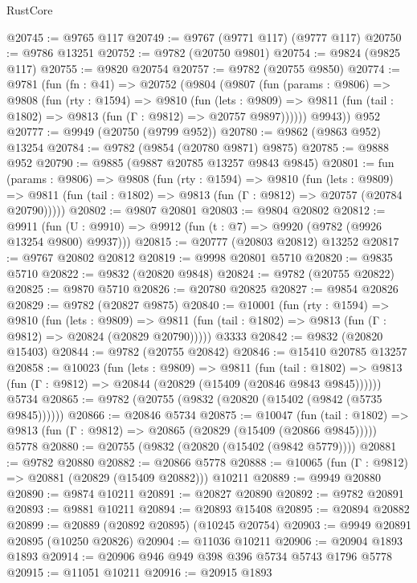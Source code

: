 \begin{lexlean}{RustCore}
\begin{coremodule}
@20745 := @9765 @117
@20749 := @9767 (@9771 @117) (@9777 @117)
@20750 := @9786 @13251
@20752 := @9782 (@20750 @9801)
@20754 := @9824 (@9825 @117)
@20755 := @9820 @20754
@20757 := @9782 (@20755 @9850)
@20774 := @9781
    (fun (fn : @41) =>
    @20752
      (@9804
        (@9807
          (fun (params : @9806) =>
          @9808
            (fun (rty : @1594) =>
            @9810
              (fun (lets : @9809) =>
              @9811 (fun (tail : @1802) => @9813 (fun (Γ : @9812) => @20757 @9897))))))
        @9943))
    @952
@20777 := @9949 (@20750 (@9799 @952))
@20780 := @9862 (@9863 @952) @13254
@20784 := @9782 (@9854 (@20780 @9871) @9875)
@20785 := @9888 @952
@20790 := @9885 (@9887 @20785 @13257 @9843 @9845)
@20801 := fun (params : @9806) =>
  @9808
    (fun (rty : @1594) =>
    @9810
      (fun (lets : @9809) =>
      @9811 (fun (tail : @1802) => @9813 (fun (Γ : @9812) => @20757 (@20784 @20790)))))
@20802 := @9807 @20801
@20803 := @9804 @20802
@20812 := @9911
    (fun (U : @9910) => @9912 (fun (t : @7) => @9920 (@9782 (@9926 @13254 @9800) @9937)))
@20815 := @20777 (@20803 @20812) @13252
@20817 := @9767 @20802 @20812
@20819 := @9998 @20801 @5710
@20820 := @9835 @5710
@20822 := @9832 (@20820 @9848)
@20824 := @9782 (@20755 @20822)
@20825 := @9870 @5710
@20826 := @20780 @20825
@20827 := @9854 @20826
@20829 := @9782 (@20827 @9875)
@20840 := @10001
    (fun (rty : @1594) =>
    @9810
      (fun (lets : @9809) =>
      @9811 (fun (tail : @1802) => @9813 (fun (Γ : @9812) => @20824 (@20829 @20790)))))
    @3333
@20842 := @9832 (@20820 @15403)
@20844 := @9782 (@20755 @20842)
@20846 := @15410 @20785 @13257
@20858 := @10023
    (fun (lets : @9809) =>
    @9811
      (fun (tail : @1802) =>
      @9813 (fun (Γ : @9812) => @20844 (@20829 (@15409 (@20846 @9843 @9845))))))
    @5734
@20865 := @9782 (@20755 (@9832 (@20820 (@15402 (@9842 (@5735 @9845))))))
@20866 := @20846 @5734
@20875 := @10047
    (fun (tail : @1802) => @9813 (fun (Γ : @9812) => @20865 (@20829 (@15409 (@20866 @9845)))))
    @5778
@20880 := @20755 (@9832 (@20820 (@15402 (@9842 @5779))))
@20881 := @9782 @20880
@20882 := @20866 @5778
@20888 := @10065 (fun (Γ : @9812) => @20881 (@20829 (@15409 @20882))) @10211
@20889 := @9949 @20880
@20890 := @9874 @10211
@20891 := @20827 @20890
@20892 := @9782 @20891
@20893 := @9881 @10211
@20894 := @20893 @15408
@20895 := @20894 @20882
@20899 := @20889 (@20892 @20895) (@10245 @20754)
@20903 := @9949 @20891 @20895 (@10250 @20826)
@20904 := @11036 @10211
@20906 := @20904 @1893 @1893
@20914 := @20906 @946 @949 @398 @396 @5734 @5743 @1796 @5778
@20915 := @11051 @10211
@20916 := @20915 @1893

\end{coremodule}
\end{lexlean}
